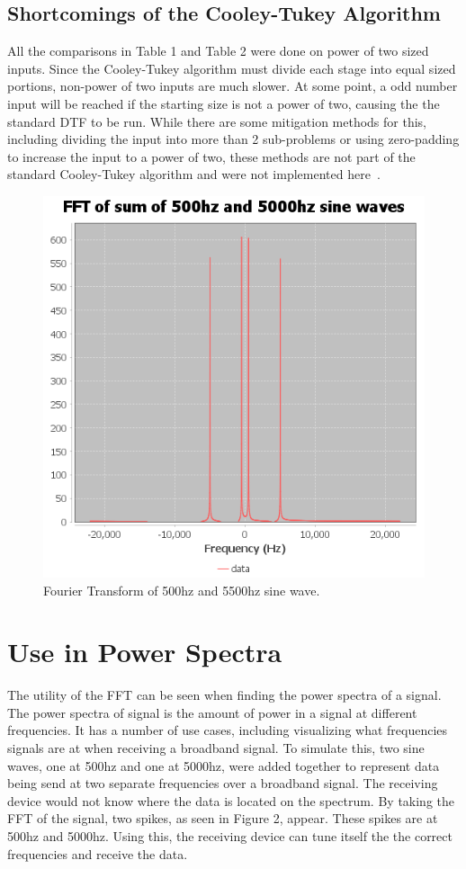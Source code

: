 \documentclass[sigconf]{acmart}
\begin{document}
\subsection{Shortcomings of the Cooley-Tukey Algorithm}
All the comparisons in Table 1 and Table 2 were done on power of two sized inputs. Since the Cooley-Tukey algorithm must divide each stage into equal sized portions, non-power of two inputs are much slower. At some point, a odd number input will be reached if the starting size is not a power of two, causing the the standard DTF to be run. While there are some mitigation methods for this, including dividing the input into more than 2 sub-problems or using zero-padding to increase the input to a power of two, these methods are not part of the standard Cooley-Tukey algorithm and were not implemented here~\cite{SplitRadix}\cite{zero-padding}.
\begin{figure}
    \includegraphics[scale=.5]{5500hz.png}
    \caption{Fourier Transform of 500hz and 5500hz sine wave.}
    \label{fig:my_label}
\end{figure}
\section{Use in Power Spectra}
The utility of the FFT can be seen when finding the power spectra of a signal. The power spectra of signal is the amount of power in a signal at different frequencies. It has a number of use cases, including visualizing what frequencies signals are at when receiving a broadband signal. To simulate this, two sine waves, one at 500hz and one at 5000hz, were added together to represent data being send at two separate frequencies over a broadband signal. The receiving device would not know where the data is located on the spectrum. By taking the FFT of the signal, two spikes, as seen in Figure 2, appear. These spikes are at 500hz and 5000hz. Using this, the receiving device can tune itself the the correct frequencies and receive the data.




\end{document}
